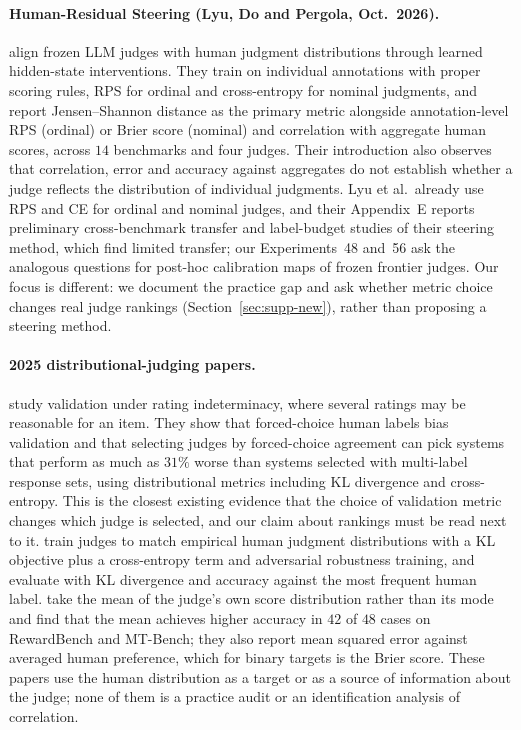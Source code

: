 \paragraph{Human-Residual Steering (Lyu, Do and Pergola, Oct.\ 2026).}
\citet{lyu2026humanresidual} align frozen LLM judges with human judgment distributions through learned hidden-state interventions.
They train on individual annotations with proper scoring rules, RPS for ordinal and cross-entropy for nominal judgments, and report Jensen--Shannon distance as the primary metric alongside annotation-level RPS (ordinal) or Brier score (nominal) and correlation with aggregate human scores, across $14$ benchmarks and four judges.
Their introduction also observes that correlation, error and accuracy against aggregates do not establish whether a judge reflects the distribution of individual judgments.
Lyu et al.\ already use RPS and CE for ordinal and nominal judges, and their Appendix~E reports preliminary cross-benchmark transfer and label-budget studies of their steering method, which find limited transfer; our Experiments~48 and~56 ask the analogous questions for post-hoc calibration maps of frozen frontier judges.
Our focus is different: we document the practice gap and ask whether metric choice changes real judge rankings (Section~\ref{sec:supp-new}), rather than proposing a steering method.

\paragraph{2025 distributional-judging papers.}
\citet{guerdan2025validating} study validation under rating indeterminacy, where several ratings may be reasonable for an item.
They show that forced-choice human labels bias validation and that selecting judges by forced-choice agreement can pick systems that perform as much as $31\%$ worse than systems selected with multi-label response sets, using distributional metrics including KL divergence and cross-entropy.
This is the closest existing evidence that the choice of validation metric changes which judge is selected, and our claim about rankings must be read next to it.
\citet{chen2025beyond} train judges to match empirical human judgment distributions with a KL objective plus a cross-entropy term and adversarial robustness training, and evaluate with KL divergence and accuracy against the most frequent human label.
\citet{wang2025improving} take the mean of the judge's own score distribution rather than its mode and find that the mean achieves higher accuracy in $42$ of $48$ cases on RewardBench and MT-Bench; they also report mean squared error against averaged human preference, which for binary targets is the Brier score.
These papers use the human distribution as a target or as a source of information about the judge; none of them is a practice audit or an identification analysis of correlation.

